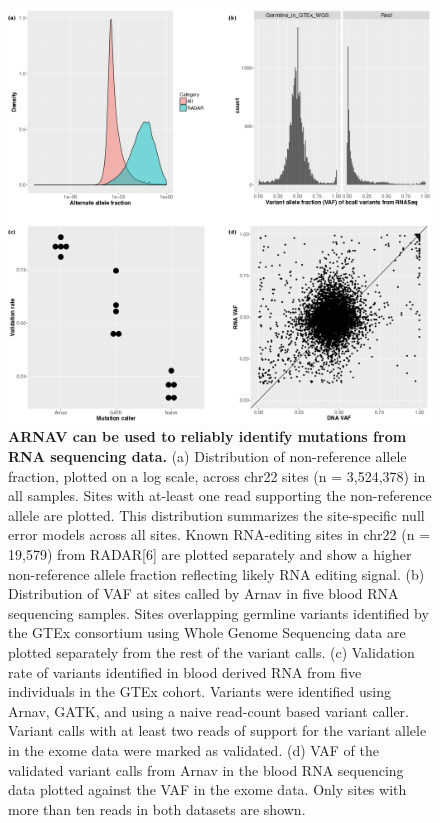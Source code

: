\begin{figure}[t!]  
    \centering
    \includegraphics[width=\linewidth, scale=0.25]{figures/appendix/appendix_figure1.png}
    \caption[ARNAV can be used to reliably identify mutations from RNA sequencing data.]{\textbf{ARNAV can be used to reliably identify mutations from RNA sequencing data.}
    (a) Distribution of non-reference allele fraction, plotted on a log scale, across chr22 sites (n = 3,524,378) in all samples. Sites with at-least one read supporting the non-reference allele are plotted. This distribution summarizes the site-specific null error models across all sites. Known RNA-editing sites in chr22 (n = 19,579) from RADAR[6] are plotted separately and show a higher non-reference allele fraction reflecting likely RNA editing signal. (b) Distribution of VAF at sites called by Arnav in five blood RNA sequencing samples. Sites overlapping germline variants identified by the GTEx consortium using Whole Genome Sequencing data are plotted separately from the rest of the variant calls. (c) Validation rate of variants identified in blood derived RNA from five individuals in the GTEx cohort. Variants were identified using Arnav, GATK, and using a naive read-count based variant caller. Variant calls with at least two reads of support for the variant allele in the exome data were marked as validated. (d) VAF of the validated variant calls from Arnav in the blood RNA sequencing data plotted against the VAF in the exome data. Only sites with more than ten reads in both datasets are shown.
    }
    \label{fig:arnav_figure1}
\end{figure}


